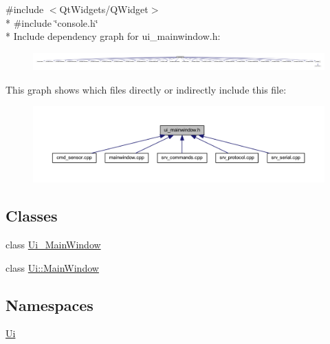 {\ttfamily \#include $<$Qt\+Widgets/\+Q\+Widget$>$}\\*
{\ttfamily \#include \char`\"{}console.\+h\char`\"{}}\\*
Include dependency graph for ui\+\_\+mainwindow.\+h\+:
\nopagebreak
\begin{figure}[H]
\begin{center}
\leavevmode
\includegraphics[width=350pt]{d3/d5e/a00275}
\end{center}
\end{figure}
This graph shows which files directly or indirectly include this file\+:
\nopagebreak
\begin{figure}[H]
\begin{center}
\leavevmode
\includegraphics[width=350pt]{dc/d28/a00276}
\end{center}
\end{figure}
\subsection*{Classes}
\begin{DoxyCompactItemize}
\item 
class \hyperlink{a00027}{Ui\+\_\+\+Main\+Window}
\item 
class \hyperlink{a00007}{Ui\+::\+Main\+Window}
\end{DoxyCompactItemize}
\subsection*{Namespaces}
\begin{DoxyCompactItemize}
\item 
 \hyperlink{a00055}{Ui}
\end{DoxyCompactItemize}

